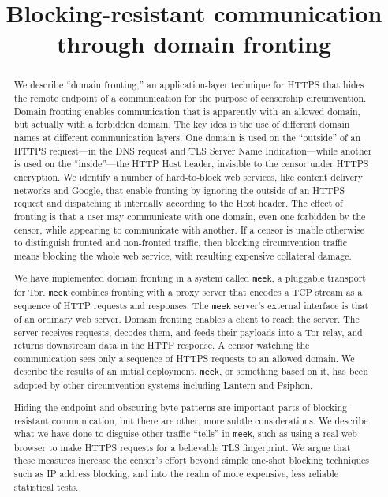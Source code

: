 \documentclass[conference]{IEEEtran}
\newcommand{\meek}{\texttt{meek}\xspace}
\begin{document}
\title{Blocking-resistant communication\\through domain fronting}


\maketitle

\begin{abstract}
We describe ``domain fronting,'' an application-layer technique
for HTTPS
that hides the remote endpoint of a communication
for the purpose of censorship circumvention.
Domain fronting enables communication that is apparently with an allowed domain,
but actually with a forbidden domain.
The key idea is the use of different domain names at different communication layers.
One domain is used on the ``outside'' of an HTTPS request---in the DNS request and
TLS Server Name Indication---while another is used
on the ``inside''---the HTTP Host header, invisible to the
censor under HTTPS encryption.
We identify a number of hard-to-block web services,
like content delivery networks and Google,
that enable fronting by ignoring the outside of an HTTPS request
and dispatching it internally according to the Host header.
The effect of fronting is that a user may communicate with one domain,
even one forbidden by the censor,
while appearing to communicate with another.
If a censor is unable otherwise to distinguish fronted and non-fronted traffic,
then blocking circumvention traffic means blocking the whole web service,
with resulting expensive collateral damage.

We have implemented domain fronting in a system called \meek,
a pluggable transport for Tor.
\meek combines fronting with a proxy server that encodes a TCP stream
as a sequence of HTTP requests and responses.
The \meek server's external interface is that of an ordinary web server.
Domain fronting enables a client to reach the server.
The server receives requests, decodes them, and feeds their payloads into a Tor relay,
and returns downstream data in the HTTP response.
A censor watching the communication sees only a sequence of HTTPS requests to an allowed domain.
We describe the results of an initial deployment.
\meek, or something based on it,
has been adopted by other circumvention systems including Lantern and Psiphon.

Hiding the endpoint and obscuring byte patterns are important parts of blocking-resistant communication,
but there are other, more subtle considerations.
We describe what we have done to disguise other traffic ``tells'' in \meek,
such as using a real web browser to make HTTPS requests
for a believable TLS fingerprint.
We argue that these measures increase the censor's effort
beyond simple one-shot blocking techniques such as IP address blocking, and into
the realm of more expensive, less reliable statistical tests.
\end{abstract}
\end{document}
